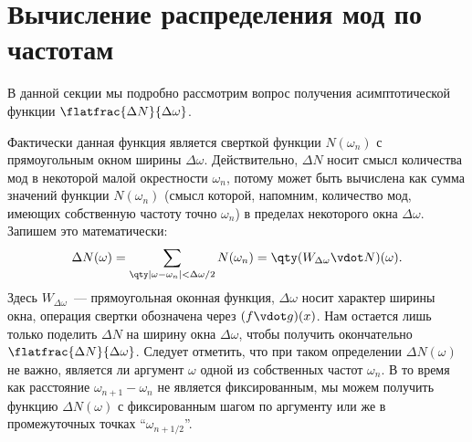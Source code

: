%
%
%
%
%
%

\section{Вычисление распределения мод по частотам\label{sec:getting_plank_formula}}

    В данной секции мы подробно рассмотрим вопрос получения асимптотической функции $\flatfrac{\Delta N}{\Delta \omega}$.

    Фактически данная функция является сверткой функции $N(\omega_n)$ с прямоугольным окном ширины $\Delta \omega$. Действительно, $\Delta N$ носит смысл количества мод в некоторой малой окрестности $\omega_n$, потому может быть вычислена как сумма значений функции $N(\omega_n)$ (смысл которой, напомним, количество мод, имеющих собственную частоту точно $\omega_n$) в пределах некоторого окна $\Delta \omega$. Запишем это математически:
    \begin{equation}
        \Delta N(\omega) = \sum\limits_{
            \qty|\omega - \omega_n| < \Delta\omega/2
        } N(\omega_n) = \qty(W_{\Delta\omega} \vdot N)(\omega) .
    \end{equation}
    Здесь $W_{\Delta\omega}$~--- прямоугольная оконная функция, $\Delta\omega$ носит характер ширины окна, операция свертки обозначена через $(f \vdot g)(x)$. Нам остается лишь только поделить $\Delta N$ на ширину окна $\Delta\omega$, чтобы получить окончательно $\flatfrac{\Delta N}{\Delta \omega}$. Следует отметить, что при таком определении $\Delta N(\omega)$ не важно, является ли аргумент $\omega$ одной из собственных частот $\omega_n$. В то время как расстояние $\omega_{n+1} - \omega_n$ не является фиксированным, мы можем получить функцию $\Delta N(\omega)$ с фиксированным шагом по аргументу или же в промежуточных точках \enquote{$\omega_{n+1/2}$}.

